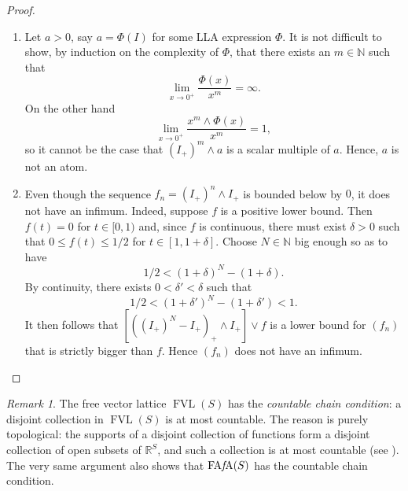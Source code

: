 \documentclass{memo-l}
\theoremstyle{definition}
\theoremstyle{remark}
\newtheorem{rem}[theorem]{Remark}
\numberwithin{section}{chapter}
\numberwithin{equation}{chapter}
\newcommand\N{\ensuremath{\mathbb{N}}}
\newcommand\R{\ensuremath{\mathbb{R}}}
\newcommand{\FAFA}[1]{\operatorname{FA{\it f}\!A}(#1)}
\newcommand{\FVL}[1]{\operatorname{FVL}(#1)}
\DeclareMathOperator{\supp}{supp}
\begin{document}
\begin{proof}
\begin{enumerate}
            If $\FAFA 1=B\oplus B^{d}$, where $B$ is a non-trivial
            band projection, then, as in \cref{prop:lat_prop_not_one},
            $\supp(B)$ and $\supp(B^{d})$ form a disconnection of
            $\R\setminus\{0\}$. So we may assume
            $\supp(B)=(0,\infty)$. Then $I_+ \in B$ and, since band
            projections are closed under multiplication,
            $B_+\subseteq B$. It follows easily that $B=B_+$, and
            similarly $B^{d}=B_-$.
        \item Let $a> 0$, say $a=\Phi (I)$ for some LLA expression
            $\Phi $. It is not difficult to
            show, by induction on the complexity of $\Phi $, that there
            exists an $m \in \N$ such that
            \[
            \lim_{x \to 0^{+}}\frac{\Phi (x)}{x^{m}}=\infty .
            \]
            On the other hand
            \[
            \lim_{x \to 0^{+}}\frac{x^{m}\wedge \Phi (x)}{x^{m}}=1,
            \]
            so it cannot be the case that $(I_+)^{m}\wedge a$ is a
            scalar multiple of $a$. Hence, $a$ is not an atom.
        \item Even though the sequence $f_n=(I_+)^{n}\wedge I_+$ is
            bounded below by $0$, it does not have an infimum. Indeed,
            suppose $f$ is a positive lower bound. Then $f(t)=0$ for $t\in
            [0,1)$ and, since $f$ is continuous, there must exist
            $\delta >0$ such that $0\le f(t)\le 1/2$ for $t \in
            [1 ,1+\delta ]$. Choose $N \in \N$ big enough so
            as to have
            \[
                1/2<(1+\delta )^{N}-(1+\delta ).
            \]
            By continuity, there exists $0<\delta '<\delta $ such that
            \[
                1/2<(1+\delta ')^{N}-(1+\delta ')<1.
            \]
            It then follows that $[((I_+)^{N}-I_+)_+\wedge I_+]\vee f$ is
            a lower bound for $(f_n)$ that is strictly bigger than
            $f$. Hence $(f_n)$ does not have an infimum.\qedhere
    \end{enumerate}
\end{proof}

\begin{rem}\label{rem:CCC}
    The free vector lattice $\FVL S$ has the \emph{countable chain
    condition}: a disjoint collection in $\FVL S$ is at most
    countable. The reason is purely topological: the supports of a disjoint collection of functions form a
    disjoint collection of open subsets of $\R^{S}$, and such a collection
    is at most countable (see \cite{ross_stone1964}). The very same argument also
    shows that $\FAFA S$ has the countable chain condition.
\end{rem}
\end{document}
